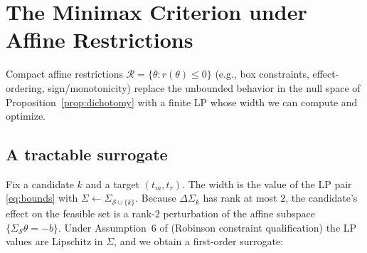 \section{The Minimax Criterion under Affine Restrictions}
\label{sec:restrictions}

Compact affine restrictions $\mathcal{R} = \{\theta : r(\theta)\le 0\}$ (e.g.,
box constraints, effect-ordering, sign/monotonicity) replace the unbounded
behavior in the null space of Proposition~\ref{prop:dichotomy} with a finite LP
whose width we can compute and optimize.

\subsection{A tractable surrogate}
\label{sec:surrogate}

Fix a candidate $k$ and a target $(t_m, t_r)$. The width is the value of the LP
pair \eqref{eq:bounds} with $\Sigma \leftarrow \Sigma_{\mathcal{S}\cup\{k\}}$.
Because $\Delta\Sigma_k$ has rank at most $2$, the candidate's effect on the
feasible set is a rank-2 perturbation of the affine subspace
$\{\Sigma_\mathcal{S}\theta = -b\}$. Under Assumption~6 of \citet{boyarsky2026} (Robinson constraint qualification) the LP values are Lipschitz in
$\Sigma$, and we obtain a first-order surrogate:

